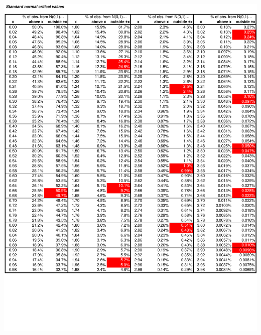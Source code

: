 \documentclass[8pt,letterpaper, landscape]{extarticle} %
\begin{document}
\begin{center}
\includegraphics[height=9.75in, angle=90]{images/cv2}

\end{center}
\end{document}
